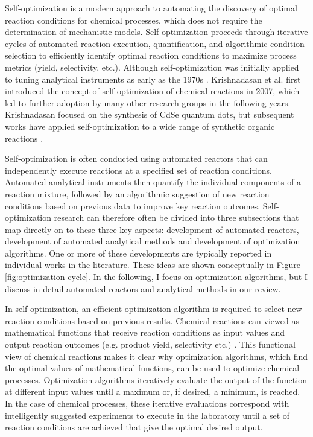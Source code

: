 Self-optimization is a modern approach to automating the discovery of optimal reaction conditions for chemical processes, which does not require the determination of mechanistic models. Self-optimization proceeds through iterative cycles of automated reaction execution, quantification, and algorithmic condition selection to efficiently identify optimal reaction conditions to maximize process metrics (yield, selectivity, etc.). Although self-optimization was initially applied to tuning analytical instruments as early as the 1970s \cite{Routh1977}. Krishnadasan et al. \cite{Krishnadasan2007} first introduced the concept of self-optimization of chemical reactions in 2007, which led to further adoption by many other research groups in the following years. Krishnadasan focused on the synthesis of CdSe quantum dots, but subsequent works have applied self-optimization to a wide range of synthetic organic reactions \cite{McMullen2010a, McMullen2011, Bourne2011, Moore2012, Christensen2020, Reizman2016b, Fitzpatrick2016,Echtermeyer2017}.

Self-optimization is often conducted using automated reactors that can independently execute reactions at a specified set of reaction conditions. Automated analytical instruments then quantify the individual components of a reaction mixture, followed by an algorithmic suggestion of new reaction conditions based on previous data to improve key reaction outcomes. Self-optimization research can therefore often be divided into three subsections that map directly on to these three key aspects: development of automated reactors, development of automated analytical methods and development of optimization algorithms. One or more of these developments are typically reported in individual works in the literature. These ideas are shown conceptually in Figure \ref{fig:optimization-cycle}.  In the following, I focus on optimization algorithms, but I discuss in detail automated reactors and analytical methods in our review.

In self-optimization, an efficient optimization algorithm is required to select new reaction conditions based on previous results. Chemical reactions can viewed as mathematical functions that receive reaction conditions as input values and output reaction outcomes (e.g. product yield, selectivity etc.) \cite{Clayton2019}. This functional view of chemical reactions makes it clear why optimization algorithms, which find the optimal values of mathematical functions, can be used to optimize chemical processes. Optimization algorithms iteratively evaluate the output of the function at different input values until a maximum or, if desired, a minimum, is reached. In the case of chemical processes, these iterative evaluations correspond with intelligently suggested experiments to execute in the laboratory until a set of reaction conditions are achieved that give the optimal desired output.

